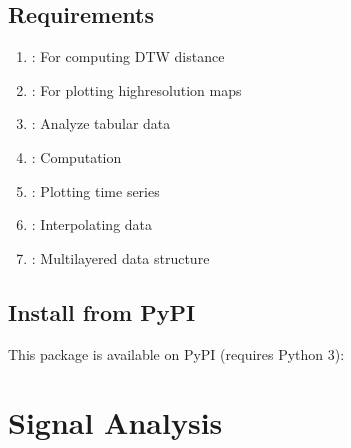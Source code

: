 \documentclass[letterpaper,10pt,english]{sphinxmanual}
\begin{document}
\section{Requirements}
\label{\detokenize{usage/install:requirements}}\begin{enumerate}
%
\item {} 
\sphinxAtStartPar
{}: For computing DTW distance

\item {} 
\sphinxAtStartPar
{}: For plotting high\sphinxhyphen{}resolution maps

\item {} 
\sphinxAtStartPar
{}: Analyze tabular data

\item {} 
\sphinxAtStartPar
{}: Computation

\item {} 
\sphinxAtStartPar
{}: Plotting time series

\item {} 
\sphinxAtStartPar
{}: Interpolating data

\item {} 
\sphinxAtStartPar
{}: Multilayered data structure

\end{enumerate}


\section{Install from PyPI}
\label{\detokenize{usage/install:install-from-pypi}}
\sphinxAtStartPar
This package is available on PyPI (requires Python 3):

\begin{sphinxVerbatim}[commandchars=\\\{\}]
  
\end{sphinxVerbatim}


\chapter{Signal Analysis}
\label{\detokenize{usage/signal_analysis_examples:signal-analysis}}\label{\detokenize{usage/signal_analysis_examples::doc}}
\end{document}
